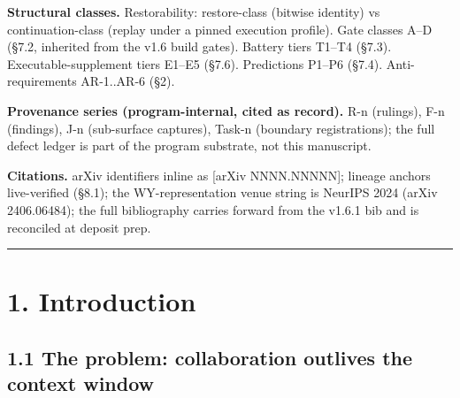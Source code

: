 \documentclass[11pt]{article}
\begin{document}
\textbf{Structural classes.} Restorability: restore-class (bitwise identity) vs continuation-class (replay under a pinned execution profile). Gate classes A--D (\S{}7.2, inherited from the v1.6 build gates). Battery tiers T1--T4 (\S{}7.3). Executable-supplement tiers E1--E5 (\S{}7.6). Predictions P1--P6 (\S{}7.4). Anti-requirements AR-1..AR-6 (\S{}2).

\textbf{Provenance series (program-internal, cited as record).} R-n (rulings), F-n (findings), J-n (sub-surface captures), Task-n (boundary registrations); the full defect ledger is part of the program substrate, not this manuscript.

\textbf{Citations.} arXiv identifiers inline as {[}arXiv NNNN.NNNNN{]}; lineage anchors live-verified (\S{}8.1); the WY-representation venue string is NeurIPS 2024 (arXiv 2406.06484); the full bibliography carries forward from the v1.6.1 bib and is reconciled at deposit prep.

\begin{center}\rule{0.5\linewidth}{0.5pt}\end{center}

\section{1. Introduction}\label{introduction}

\subsection{1.1 The problem: collaboration outlives the context window}\label{the-problem-collaboration-outlives-the-context-window}
\end{document}
